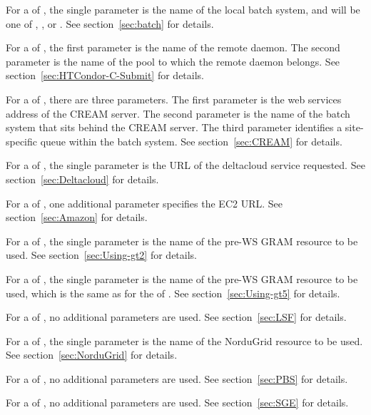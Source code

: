 \begin{description}
For a  of ,
the single parameter is the name of the local batch system,
and will be one of , , or .
See section~\ref{sec:batch} for details.

For a  of ,
the first parameter is the name of the remote 
daemon.
The second parameter is the name of the pool to which the remote
 daemon belongs.
See section~\ref{sec:HTCondor-C-Submit} for details.

For a  of ,
there are three parameters.
The first parameter is the web services address of the CREAM server.
The second parameter is the 
name of the batch system that sits behind the CREAM server.
The third parameter identifies a site-specific queue
within the batch system.
See section~\ref{sec:CREAM} for details.

For a  of ,
the single parameter is the URL of the deltacloud service requested.
See section~\ref{sec:Deltacloud} for details.

For a  of ,
one additional parameter specifies the EC2 URL. 
See section~\ref{sec:Amazon}  for details. 

For a  of ,
the single parameter is the name of the pre-WS GRAM resource to be used.
See section~\ref{sec:Using-gt2} for details.

For a  of ,
the single parameter is the name of the pre-WS GRAM resource to be used,
which is the same as for the  of .
See section~\ref{sec:Using-gt5} for details.

For a  of , no additional
parameters are used.
See section~\ref{sec:LSF} for details.

For a  of ,
the single parameter is the name of the NorduGrid resource to be used.
See section~\ref{sec:NorduGrid} for details.

For a  of , no additional
parameters are used.
See section~\ref{sec:PBS} for details.

For a  of , no additional
parameters are used.
See section~\ref{sec:SGE} for details.


\end{description}
